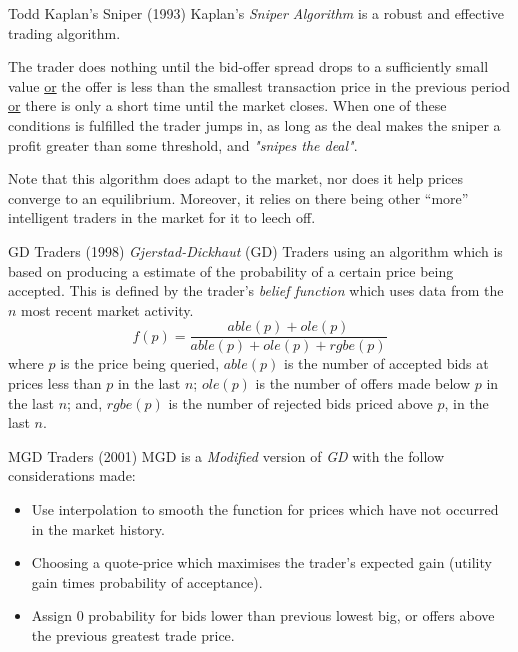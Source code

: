 \documentclass[11pt,a4paper]{article}
\begin{document}
  \begin{proposition}{Todd Kaplan's Sniper (1993)}
    Kaplan's \textit{Sniper Algorithm} is a robust and effective trading algorithm.
    \par The trader does nothing until the bid-offer spread drops to a sufficiently small value \underline{or} the offer is less than the smallest transaction price in the previous period \underline{or} there is only a short time until the market closes. When one of these conditions is fulfilled the trader jumps in, as long as the deal makes the sniper a profit greater than some threshold, and \textit{"snipes the deal"}.
    \par Note that this algorithm does adapt to the market, nor does it help prices converge to an equilibrium. Moreover, it relies on there being other ``more'' intelligent traders in the market for it to leech off.
  \end{proposition}

  \begin{proposition}{GD Traders (1998)}
    \textit{Gjerstad-Dickhaut} (GD) Traders using an algorithm which is based on producing a estimate of the probability of a certain price being accepted. This is defined by the trader's \textit{belief function} which uses data from the $n$ most recent market activity.
    \[ f(p)=\frac{able(p)+ole(p)}{able(p)+ole(p)+rgbe(p)} \]
    where $p$ is the price being queried, $able(p)$ is the number of accepted bids at prices less than $p$ in the last $n$; $ole(p)$ is the number of offers made below $p$ in the last $n$; and, $rgbe(p)$ is the number of rejected bids priced above $p$, in the last $n$.
  \end{proposition}

  \begin{proposition}{MGD Traders (2001)}
    MGD is a \textit{Modified} version of \textit{GD} with the follow considerations made:
    \begin{itemize}
      \item Use interpolation to smooth the function for prices which have not occurred in the market history.
      \item Choosing a quote-price which maximises the trader's expected gain (utility gain times probability of acceptance).
      \item Assign 0 probability for bids lower than previous lowest big, or offers above the previous greatest trade price.
    \end{itemize}
  \end{proposition}
\end{document}
